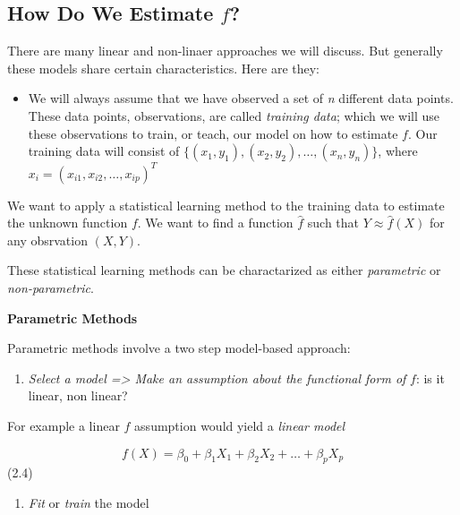 \documentclass[
  letterpaper,
  DIV=11,
  numbers=noendperiod]{scrreprt}
\providecommand{\tightlist}{%
  \setlength{\itemsep}{0pt}\setlength{\parskip}{0pt}}\usepackage{longtable,booktabs,array}
\begin{document}
\hypertarget{how-do-we-estimate-f}{%
\subsection{\texorpdfstring{How Do We Estimate
\(f\)?}{How Do We Estimate f?}}\label{how-do-we-estimate-f}}

There are many linear and non-linaer approaches we will discuss. But
generally these models share certain characteristics. Here are they:

\begin{itemize}
\tightlist
\item
  We will always assume that we have observed a set of \emph{n}
  different data points. These data points, observations, are called
  \emph{training data}; which we will use these observations to train,
  or teach, our model on how to estimate \(f\). Our training data will
  consist of \(\{(x_1,y_1), (x_2,y_2), \dots, (x_n,y_n)\}\), where
  \(x_i = (x_{i1}, x_{i2}, \dots, x_{ip})^T\)
\end{itemize}

We want to apply a statistical learning method to the training data to
estimate the unknown function \(f\). We want to find a function
\(\hat{f}\) such that \(Y \approx \hat{f}(X)\) for any obsrvation
\((X,Y)\).

These statistical learning methods can be charactarized as either
\emph{parametric} or \emph{non-parametric}.

\textbf{Parametric Methods}

Parametric methods involve a two step model-based approach:

\begin{enumerate}
\def\labelenumi{\arabic{enumi}.}
\tightlist
\item
  \emph{Select a model =\textgreater{} Make an assumption about the
  functional form of} \(f\): is it linear, non linear?
\end{enumerate}

For example a linear \(f\) assumption would yield a \emph{linear model}

\[
  f(X) = \beta_0 + \beta_1X_1 + \beta_2X_2 + \dots + \beta_pX_p
  \] (2.4)

\begin{enumerate}
\def\labelenumi{\arabic{enumi}.}
\setcounter{enumi}{1}
\tightlist
\item
  \emph{Fit} or \emph{train} the model
\end{enumerate}
\end{document}
